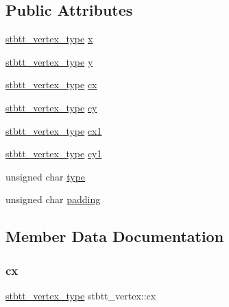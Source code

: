 \subsection*{Public Attributes}
\begin{DoxyCompactItemize}
\item 
\hyperlink{imstb__truetype_8h_ab8fd8e5e0b82b0f7da54532035e47b22}{stbtt\+\_\+vertex\+\_\+type} \hyperlink{structstbtt__vertex_a81773edbe760d0e090561a3c1e86c919}{x}
\item 
\hyperlink{imstb__truetype_8h_ab8fd8e5e0b82b0f7da54532035e47b22}{stbtt\+\_\+vertex\+\_\+type} \hyperlink{structstbtt__vertex_a9052065ca544b63d537325b246928cfc}{y}
\item 
\hyperlink{imstb__truetype_8h_ab8fd8e5e0b82b0f7da54532035e47b22}{stbtt\+\_\+vertex\+\_\+type} \hyperlink{structstbtt__vertex_a43835489e2a151b31cb100d20f8adeae}{cx}
\item 
\hyperlink{imstb__truetype_8h_ab8fd8e5e0b82b0f7da54532035e47b22}{stbtt\+\_\+vertex\+\_\+type} \hyperlink{structstbtt__vertex_a5610d6335aa6962d970fc7fd2225545e}{cy}
\item 
\hyperlink{imstb__truetype_8h_ab8fd8e5e0b82b0f7da54532035e47b22}{stbtt\+\_\+vertex\+\_\+type} \hyperlink{structstbtt__vertex_a1c45a8d41727b24b84f97a944f2b800a}{cx1}
\item 
\hyperlink{imstb__truetype_8h_ab8fd8e5e0b82b0f7da54532035e47b22}{stbtt\+\_\+vertex\+\_\+type} \hyperlink{structstbtt__vertex_a68227d28643f5667064fa3c385f4ea7d}{cy1}
\item 
unsigned char \hyperlink{structstbtt__vertex_aa325b3707b88e7e104c0de46bb2bf395}{type}
\item 
unsigned char \hyperlink{structstbtt__vertex_a8bd328747e8ea018612960a52e3e3ede}{padding}
\end{DoxyCompactItemize}


\subsection{Member Data Documentation}
\mbox{\label{structstbtt__vertex_a43835489e2a151b31cb100d20f8adeae}} 
\subsubsection{\texorpdfstring{cx}{cx}}
{\footnotesize\ttfamily \hyperlink{imstb__truetype_8h_ab8fd8e5e0b82b0f7da54532035e47b22}{stbtt\+\_\+vertex\+\_\+type} stbtt\+\_\+vertex\+::cx}

